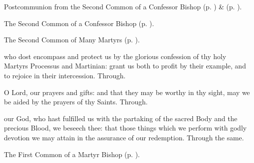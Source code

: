\begin{rubric}
	  Postcommunion  from the Second Common of a Confessor Bishop (p. \pageref{CommonConfessorBishopIIPostcommunion}) \&   (p. \pageref{ProcessusPostcommunion}).
\end{rubric}



\begin{rubric}
	The Second Common of a Confessor Bishop (p. \pageref{CommonConfessorBishopII}).
\end{rubric}



\begin{rubric}
	The Second Common of Many Martyrs (p. \pageref{CommonMartyrsII}).
\end{rubric}

\collect\label{ProcessusCollect}
 who dost encompass and protect us by the glorious confession of thy holy Martyrs Processus and Martinian: grant us both to profit by their example, and to rejoice in their intercession. Through.

\secret\label{ProcessusSecret}
 O Lord, our prayers and gifts: and that they may be worthy in thy sight, may we be aided by the prayers of thy Saints. Through.


\postcommunion\label{ProcessusPostcommunion}
 our God, who hast fulfilled us with the partaking of the sacred Body and the precious Blood, we beseech thee: that those things which we perform with godly devotion we may attain in the assurance of our redemption. Through the same.


\clearpage
{}

\begin{rubric}
	The First Common of a Martyr Bishop (p. \pageref{CommonMartyrBishopI}).
\end{rubric}

\vspace{-0.15\baselineskip}

\collect

